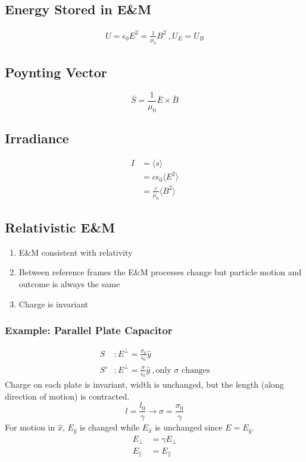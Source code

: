 \documentclass[10pt,a4paper]{article}
\begin{document}
\subsection{Energy Stored in E\&M}
\begin{align}
 U = \epsilon_0 E^2 = \frac{1}{\mu_0}B^2~,U_E = U_B 
\end{align}

\subsection{Poynting Vector}
\begin{equation}
 \bar{S} = \frac{1}{\mu_0} \bar{E} \times \bar{B} 
\end{equation}

\subsection{Irradiance}
\begin{align}
 I &= \langle s \rangle\\
   &=  c\epsilon_0\langle E^2 \rangle\\
   &= \frac{c}{\mu_0}\langle B^2 \rangle
\end{align}

\subsection{Relativistic E\&M}
\begin{enumerate}
    \item E\&M consistent with relativity
    \item Between reference frames the E\&M processes change but particle motion and outcome is always the same
    \item Charge is invariant
\end{enumerate}
\subsubsection{Example: Parallel Plate Capacitor}
\begin{align}
 S&: E^\perp = \frac{\sigma_0}{\epsilon_0} \hat{y}\\
 S'&:E^\perp = \frac{\sigma}{\epsilon_0}\hat{y}~,\textrm{only } \sigma \textrm{ changes}
\end{align}
Charge on each plate is invariant, width is unchanged, but the length (along direction of motion) is contracted.
\begin{equation}
 l = \frac{l_0}{\gamma} \rightarrow \sigma = \frac{\sigma_0}{\gamma}
\end{equation}
For motion in $\hat{x}$, $E_{\hat{y}}$ is changed while $E_{\hat{x}}$ is unchanged since $E = E_{\hat{y}}$. 
\begin{align}
 E_\perp &= \gamma E_\perp\\
 E_\parallel &= E_\parallel 
\end{align}
\end{document}
